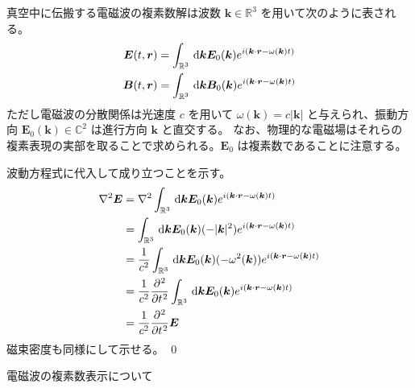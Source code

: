 \documentclass[uplatex,dvipdfmx,a4paper,11pt]{jlreq}
\makeatletter
\newcommand{\CC}{\mathbb{C}}
\newcommand{\RR}{\mathbb{R}}
\newcommand{\EE}{\bm{E}}
\newcommand{\BB}{\bm{B}}
\newcommand{\rr}{\bm{r}}
\newcommand{\kk}{\bm{k}}
\numberwithin{equation}{section}
\theoremstyle{definition}
\renewenvironment{proof}[1][\proofname]{\par
  \normalfont
  \topsep6\p@\@plus6\p@ \trivlist
  \item[\hskip\labelsep{\bfseries #1}\@addpunct{\bfseries}]\ignorespaces\quad\par
}{%
  \qed\endtrivlist\@endpefalse
}
\renewcommand\proofname{証明}
\makeatother
\begin{document}
\begin{theorem}[電磁波の複素数表現]
  真空中に伝搬する電磁波の複素数解は波数 $\kk\in\RR^3$ を用いて次のように表される。
  \begin{align}
    \EE(t, \rr) & = \int_{\RR^3}\dl{\kk}\EE_0(\kk)e^{i(\kk\cdot\rr - \omega(\kk)t)} \\
    \BB(t, \rr) & = \int_{\RR^3}\dl{\kk}\BB_0(\kk)e^{i(\kk\cdot\rr - \omega(\kk)t)}
  \end{align}
  ただし電磁波の分散関係は光速度 $c$ を用いて $\omega(\kk) = c|\kk|$ と与えられ、振動方向 $\EE_0(\kk)\in\CC^2$ は進行方向 $\kk$ と直交する。
  なお、物理的な電磁場はそれらの複素表現の実部を取ることで求められる。$\EE_0$ は複素数であることに注意する。
\end{theorem}
\begin{proof}
  波動方程式に代入して成り立つことを示す。
  \begin{align}
    \nabla^2\EE & = \nabla^2\int_{\RR^3}\dl{\kk}\EE_0(\kk)e^{i(\kk\cdot\rr - \omega(\kk)t)}                      \\
                & = \int_{\RR^3}\dl{\kk}\EE_0(\kk)(-|\kk|^2)e^{i(\kk\cdot\rr - \omega(\kk)t)}                    \\
                & = \frac{1}{c^2}\int_{\RR^3}\dl{\kk}\EE_0(\kk)(-\omega^2(\kk))e^{i(\kk\cdot\rr - \omega(\kk)t)} \\
                & = \frac{1}{c^2}\diffp[2]{}{t}\int_{\RR^3}\dl{\kk}\EE_0(\kk)e^{i(\kk\cdot\rr - \omega(\kk)t)}   \\
                & = \frac{1}{c^2}\diffp[2]{}{t}\EE
  \end{align}
  磁束密度も同様にして示せる。
\end{proof}

電磁波の複素数表示について
\end{document}
